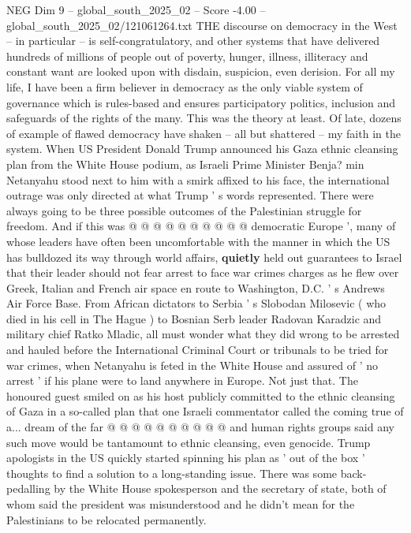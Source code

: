 \begin{textsample}{NEG Dim 9 – global\_south\_2025\_02 – Score -4.00 – global\_south\_2025\_02/121061264.txt}  \label{ex:f9_neg_064}
THE discourse on democracy in the West -- in particular -- is self-congratulatory, and other systems that have delivered hundreds of millions of people out of poverty, hunger, illness, illiteracy and constant want are looked upon with disdain, suspicion, even derision.
For all my life, I have been a firm believer in democracy as the only viable system of governance which is rules-based and ensures participatory politics, inclusion and safeguards of the rights of the many.
This was the theory at least.
Of late, dozens of example of flawed democracy have shaken -- all but shattered -- my faith in the system.
When US President Donald Trump announced his Gaza ethnic cleansing plan from the White House podium, as Israeli Prime Minister Benja? min Netanyahu stood next to him with a smirk affixed to his face, the international outrage was only directed at what Trump ' s words represented.
There were always going to be three possible outcomes of the Palestinian struggle for freedom.
And if this was @ @ @ @ @ @ @ @ @ @ democratic Europe ', many of whose leaders have often been uncomfortable with the manner in which the US has bulldozed its way through world affairs, \textbf{quietly} held out guarantees to Israel that their leader should not fear arrest to face war crimes charges as he flew over Greek, Italian and French air space en route to Washington, D.C. ' s Andrews Air Force Base.
From African dictators to Serbia ' s Slobodan Milosevic ( who died in his cell in The Hague ) to Bosnian Serb leader Radovan Karadzic and military chief Ratko Mladic, all must wonder what they did wrong to be arrested and hauled before the International Criminal Court or tribunals to be tried for war crimes, when Netanyahu is feted in the White House and assured of ' no arrest ' if his plane were to land anywhere in Europe.
Not just that.
The honoured guest smiled on as his host publicly committed to the ethnic cleansing of Gaza in a so-called plan that one Israeli commentator called the coming true of a... dream of the far @ @ @ @ @ @ @ @ @ @ and human rights groups said any such move would be tantamount to ethnic cleansing, even genocide.
Trump apologists in the US quickly started spinning his plan as ' out of the box ' thoughts to find a solution to a long-standing issue.
There was some back-pedalling by the White House spokesperson and the secretary of state, both of whom said the president was misunderstood and he didn't mean for the Palestinians to be relocated permanently.

\end{textsample}
